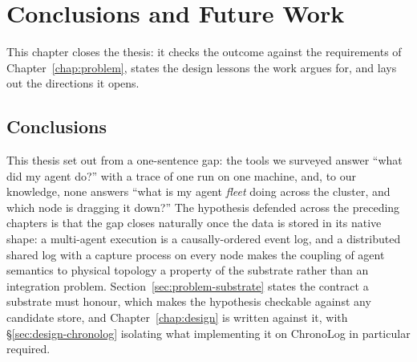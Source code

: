 \chapter{Conclusions and Future Work}
\label{chap:conclusions}

This chapter closes the thesis: it checks the outcome against the
requirements of Chapter~\ref{chap:problem}, states the design lessons
the work argues for, and lays out the directions it opens.

\section{Conclusions}
\label{sec:conclusions}

This thesis set out from a one-sentence gap: the tools we surveyed answer
``what did my agent do?'' with a trace of one run on one machine,
and, to our knowledge, none answers ``what is my agent \emph{fleet}
doing across the cluster, and which node is dragging it down?'' The hypothesis defended across the preceding
chapters is that the gap closes naturally once the data is stored in its
native shape: a multi-agent execution is a causally-ordered event log, and
a distributed shared log with a capture process on every node makes the
coupling of agent semantics to physical topology a property
of the substrate rather than an integration problem.
Section~\ref{sec:problem-substrate} states the contract a substrate must
honour, which makes the hypothesis checkable against any candidate store, and
Chapter~\ref{chap:design} is written against it, with
\S\ref{sec:design-chronolog} isolating what implementing it on ChronoLog
in particular required.

